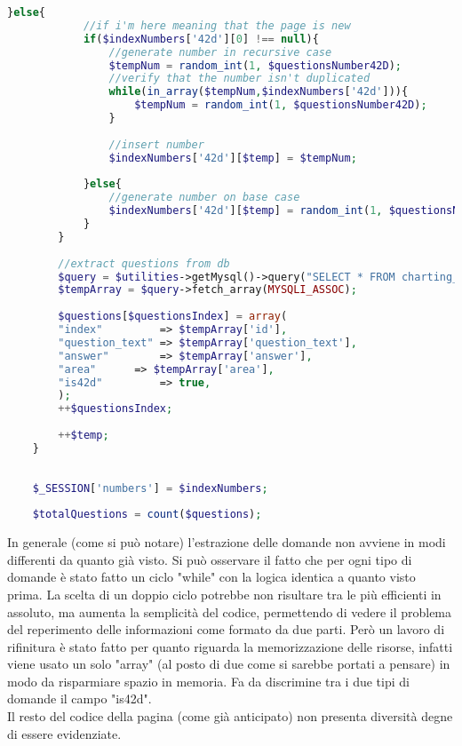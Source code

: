 \begin{lstlisting}[language=php]
		}else{
			//if i'm here meaning that the page is new
			if($indexNumbers['42d'][0] !== null){
				//generate number in recursive case
				$tempNum = random_int(1, $questionsNumber42D);
				//verify that the number isn't duplicated
				while(in_array($tempNum,$indexNumbers['42d'])){
					$tempNum = random_int(1, $questionsNumber42D);
				}
				
				//insert number
				$indexNumbers['42d'][$temp] = $tempNum;
				
			}else{
				//generate number on base case
				$indexNumbers['42d'][$temp] = random_int(1, $questionsNumber42D);
			}
		}
		
		//extract questions from db
		$query = $utilities->getMysql()->query("SELECT * FROM charting_test_42d WHERE (id = '{$indexNumbers['42d'][$temp]}')");
		$tempArray = $query->fetch_array(MYSQLI_ASSOC);  
		
		$questions[$questionsIndex] = array(
		"index"         => $tempArray['id'],
		"question_text" => $tempArray['question_text'],
		"answer"        => $tempArray['answer'],
		"area"		=> $tempArray['area'],	
		"is42d"         => true,
		);
		++$questionsIndex;
		
		++$temp;
	}
	
	
	$_SESSION['numbers'] = $indexNumbers;
	
	$totalQuestions = count($questions);
\end{lstlisting}
In generale (come si può notare) l'estrazione delle domande non avviene in modi differenti da quanto già visto. Si può osservare il fatto che per ogni tipo di domande è stato fatto un ciclo "while" con la logica identica a quanto visto prima. La scelta di un doppio ciclo potrebbe non risultare tra le più efficienti in assoluto, ma aumenta la semplicità del codice, permettendo di vedere il problema del reperimento delle informazioni come formato da due parti. Però un lavoro di rifinitura è stato fatto per quanto riguarda la memorizzazione delle risorse, infatti viene usato un solo "array" (al posto di due come si sarebbe portati a pensare) in modo da risparmiare spazio in memoria. Fa da discrimine tra i due tipi di domande il campo "is42d".\\
Il resto del codice della pagina (come già anticipato) non presenta diversità degne di essere evidenziate.\\

